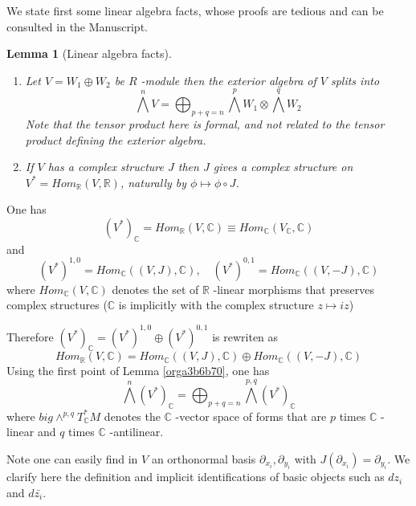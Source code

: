 \documentclass[11pt]{article}
\newtheorem{lemma}[theorem]{Lemma}
\begin{document}
We state first some linear algebra facts, whose proofs are tedious and can be consulted in the Manuscript.

\begin{lemma}[Linear algebra facts]
\label{lem:alg-exterior}
\label{orga3b6b70}
\begin{enumerate}
\item Let \(V = W_1 \oplus W_2\) be \(R\) -module then the exterior algebra of \(V\) splits into \[\bigwedge^nV
   = \bigoplus_{p+q = n}\bigwedge^p W_1 \otimes \bigwedge^q W_2 \] Note that the tensor product here
is formal, and not related to the tensor product defining the exterior algebra.
\item If \(V\) has a complex structure \(J\) then \(J\) gives a complex structure on \(V^* =
   Hom_{\mathbb{R}}(V, \mathbb{R})\), naturally by \(\phi\mapsto \phi\circ J\).
\end{enumerate}
\end{lemma}

One has 
\[
(V^*)_{\mathbb{C}} = Hom_{\mathbb{R}}(V,\mathbb{C}) \equiv Hom_{\mathbb{C}}(V_{\mathbb{C}},
\mathbb{C})
\]
and 
\[
(V^*)^{1,0} = Hom_{\mathbb{C}}((V,J), \mathbb{C}),\quad (V^*)^{0,1} = Hom_{\mathbb{C}}((V,-J),\mathbb{C})
\]
where \(Hom_{\mathbb{C}}(V,\mathbb{C})\) denotes the set of \(\mathbb{R}\) -linear morphisms that preserves
complex structures (\(\mathbb{C}\) is implicitly with the complex structure \(z\mapsto iz\))

Therefore \((V^*)_{\mathbb{C}} = (V^*)^{1,0} \oplus (V^{*})^{0,1}\) is rewriten as
\[
Hom_{\mathbb{R}}(V,\mathbb{C}) = Hom_{\mathbb{C}}((V,J),\mathbb{C}) \oplus Hom_{\mathbb{C}}((V,-J), \mathbb{C})
\]
Using the first point of Lemma \ref{orga3b6b70}, one has
\[
\bigwedge^n (V^*)_{\mathbb{C}} = \bigoplus_{p+q=n}\bigwedge^{p,q}(V^*)_{\mathbb{C}}
\]
where \(big\wedge^{p,q}T^*_{\mathbb{C}}M\) denotes the \(\mathbb{C}\) -vector space of forms that are \(p\) times \(\mathbb{C}\) -linear and \(q\) times \(\mathbb{C}\) -antilinear.


Note one can easily find in \(V\) an orthonormal basis \(\partial_{x_i},\partial_{y_i}\) with
\(J(\partial_{x_i}) = \partial_{y_i}\). We clarify here the definition and implicit identifications of
basic objects such as \(dz_i\) and \(d\bar{z_i}\).
\end{document}
